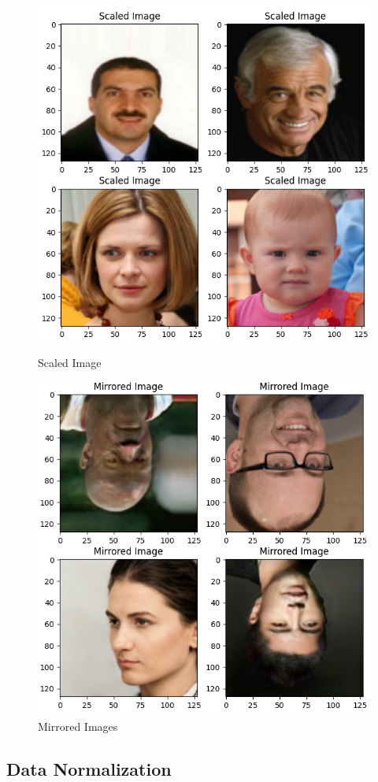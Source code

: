\begin{figure}[hbt!]
		\vspace{0.5cm} %

		\begin{minipage}{0.45\textwidth}
				\centering
				\includegraphics[width=0.95\linewidth]{./img/scaled.png}
				\caption{Scaled Image}
		\end{minipage}
		\hfill
		\begin{minipage}{0.45\textwidth}
				\centering
				\includegraphics[width=0.95\linewidth]{./img/mirrored.png}
				\caption{Mirrored Images}
		\end{minipage}
	\end{figure}

	\subsection{Data Normalization}
	